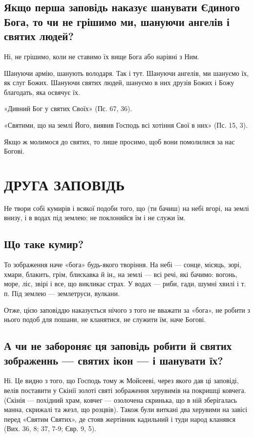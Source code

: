 \documentclass[main.tex]{subfiles}
\begin{document}
\subsection{Якщо перша заповідь наказує шанувати Єдиного Бога, то чи не грішимо ми, шануючи ангелів і святих людей?}

Ні, не грішимо, коли не ставимо їх вище Бога або нарівні з Ним.

Шануючи армію, шанують володаря. Так і тут. Шануючи ангелів, ми шануємо їх, як слуг Божих. Шануючи святих людей, шануємо в них друзів Божих і Божу благодать, яка освячує їх.

«Дивний Бог у святих Своїх» (Пс. 67, 36).

«Святими, що на землі Його, виявив Господь всі хотіння Свої в них» (Пс. 15, 3).

Якщо ж молимося до святих, то лише просимо, щоб вони помолилися за нас Богові.

\section{ДРУГА ЗАПОВІДЬ}

Не твори собі кумирів і всякої подоби того, що (ти бачиш) на небі вгорі, на землі внизу, і в водах під землею; не поклоняйся їм і не служи їм.

\subsection{Що таке кумир?}

То зображення наче «бога» будь-якого творіння. На небі — сонце, місяць, зорі, хмари, блакить, грім, блискавка й ін„ на землі — всі речі, які бачимо: вогонь, море, ліс, звірі і все, що викликає страх. У водах — риби, гади, шумні хвилі і т. п. Під землею — землетруси, вулкани.

Отже, цією заповіддю наказується нічого з того не вважати за «бога», не робити з нього подоб для пошани, не кланятися, не служити їм, наче Богові.

\subsection{А чи не забороняє ця заповідь робити й святих зображеннь — святих ікон — і шанувати їх?}

Ні. Це видно з того, що Господь тому ж Мойсееві, через якого дав ці заповіді, велів поставити у Скінії золоті святі зображення херувимів на покришці ковчега. (Скінія — похідний храм, ковчег — озолочена скринька, що в ній зберігалась манна, скрижалі та жезл, що розцвів). Також були виткані два херувими на завісі перед «Святим Святих», де стояв жертівник кадильний і туди народ кланявся (Вих. 36, 8; 37, 7-9; Євр. 9, 5).
\end{document}
